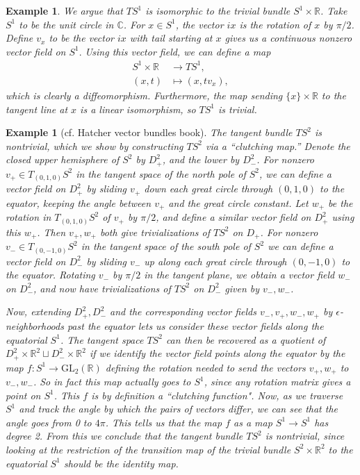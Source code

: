 \documentclass{amsart}          %
\newtheorem{example}[theorem]{Example}
\newcommand{\R}{\mathbb R}
\newcommand{\C}{\mathbb C}
\begin{document}
\begin{example} We argue that $TS^1$ is isomorphic to the trivial bundle $S^1\times\R$.
	Take $S^1$ to be the unit circle in $\C$.  For $x\in S^1$, the vector $ix$ is the rotation of $x$ by $\pi/2$. 
	Define $v_x$ to be the vector $ix$ with tail starting at $x$ gives us a continuous nonzero vector field on $S^1.$ Using this vector field, we can define a map
	\begin{align*}
	S^1\times\R&\to TS^1,\\
	(x,t)&\mapsto (x,tv_x),
 	\end{align*}
 	which is clearly a diffeomorphism. Furthermore, the map sending $\{x\}\times\R$ to the tangent line at $x$ is a linear isomorphism, so $TS^1$ is trivial.
\end{example}
\begin{example}[cf. Hatcher vector bundles book]
	The tangent bundle $TS^2$ is nontrivial, which we show by constructing $TS^2$ via a ``clutching map.'' Denote the closed upper hemisphere of $S^2$ by $D_+^2$, and the  lower  by $D_-^2$. 
	For nonzero $v_+\in T_{(0,1,0)}S^2$ in the tangent space of the north pole of $S^2$, we can define a vector field on $D_+^2$ by sliding $v_+$ down each great circle through $(0,1,0)$ to the equator, keeping the angle between $v_+$ and the great circle constant. Let $w_+$ be the rotation in $T_{(0,1,0)}S^2$ of $v_+$ by $\pi/2$, and define a similar vector field on $D^2_+$ using this $w_+$. Then $v_+,w_+$ both give trivializations of $TS^2$ on $D_+$. For nonzero $v_-\in T_{(0,-1,0)}S^2$ in the tangent space of the south pole of $S^2$ we can define a vector field on $D_-^2$ by sliding $v_-$ up along each great circle through $(0,-1,0)$ to the equator. Rotating $v_-$ by $\pi/2$ in the tangent plane, we obtain a vector field $w_-$ on $D^2_-$, and now have trivializations of $TS^2$ on $D_-^2$ given by $v_-,w_-$. 
	
	Now, extending $D_+^2,D_-^2$ and the corresponding vector fields $v_-,v_+,w_-,w_+$ by $\epsilon$-neighborhoods past the equator lets us consider these vector fields along the equatorial $S^1$. The tangent space $TS^2$ can then be recovered as a quotient of $D_+^2\times\R^2\sqcup D_-^2\times\R^2$ if we identify the vector field points along the equator by the map $f:S^1\to\text{GL}_2(\R)$ defining the rotation needed to send the vectors $v_+,w_+$ to $v_-,w_-$. So in fact this map actually goes to $S^1$, since any rotation matrix gives a point on $S^1$. This $f$ is by definition a ``clutching function". Now, as we traverse $S^1$ and track the angle by which the pairs of vectors differ, we can see that the angle goes from 0 to $4\pi$. This tells us that the map $f$ as a map $S^1\to S^1$ has degree 2. From this we conclude that the tangent bundle $TS^2$ is nontrivial, since looking at the restriction of the transition map of the trivial bundle $S^2\times\R^2$ to the equatorial $S^1$ should be the identity map.
\end{example}
\end{document}
